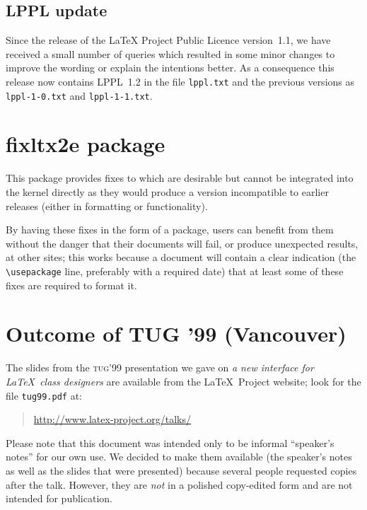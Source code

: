 \documentclass{ltnews}
\providecommand{\acro}[1]{\textsc{\MakeLowercase{#1}}}
\providecommand\file[1]{\texttt{#1}}
\begin{document}
\maketitle

\subsection{LPPL update}

Since the release of the \LaTeX{} Project Public Licence version~1.1,
we have received a small number of queries which resulted in some
minor changes to improve the wording or explain the intentions better.
As a consequence this release now contains LPPL~1.2 in the file
\file{lppl.txt} and the previous versions as \file{lppl-1-0.txt} and
\file{lppl-1-1.txt}.

\section{fixltx2e package}

    This package provides fixes to \LaTeXe{} which are desirable but
    cannot be integrated into the \LaTeXe{} kernel directly as they
    would produce a version incompatible to earlier releases (either
    in formatting or functionality).

    By having these fixes in the form of a package, users can benefit
    from them without the danger that their documents will fail, or
    produce unexpected results, at other sites; this works because a
    document will contain a clear indication (the \verb=\usepackage=
    line, preferably with a required date) that at least some of these
    fixes are required to format it.

\section{Outcome of TUG '99 (Vancouver)}

The slides from the \acro{TUG}'99 presentation we gave on \emph{a
new interface for \LaTeX\ class designers} are available from the
\LaTeX\ Project website; look for the file \verb|tug99.pdf| at:
\begin{quote}
   \url{http://www.latex-project.org/talks/}
\end{quote}

Please note that this document was intended only to be informal
``speaker's notes'' for our own use. We decided to make them available (the
speaker's notes as well as the slides that were presented) because several
people requested copies after the talk. However, they are \emph{not} in
a polished copy-edited form and are not intended for publication.
\end{document}
